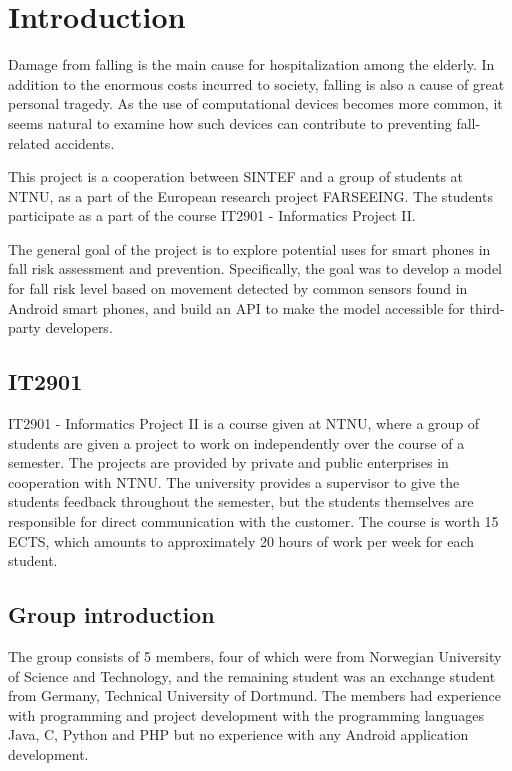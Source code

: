 \chapter{Introduction}

Damage from falling is the main cause for hospitalization among the elderly. In addition to the enormous costs incurred to society, falling is also a cause of great personal tragedy. As the use of computational devices becomes more common, it seems natural to examine how such devices can contribute to preventing fall-related accidents.

This project is a cooperation between SINTEF and a group of students at NTNU, as a part of the European research project FARSEEING. The students participate as a part of the course IT2901 - Informatics Project II.

The general goal of the project is to explore potential uses for smart phones in fall risk assessment and prevention. Specifically, the goal was to develop a model for fall risk level based on movement detected by common sensors found in Android smart phones, and build an API to make the model accessible for third-party developers.



\section{IT2901}
IT2901 - Informatics Project II is a course given at NTNU, where a group of students are given a project to work on independently over the course of a semester. The projects are provided by private and public enterprises in cooperation with NTNU. The university provides a supervisor to give the students feedback throughout the semester, but the students themselves are responsible for direct communication with the customer. The course is worth 15 ECTS, which amounts to approximately 20 hours of work per week for each student. 

\section{Group introduction}
The group consists of 5 members, four of which were from Norwegian University of Science and Technology, and the remaining student was an exchange student from Germany, Technical University of Dortmund. The members had experience with programming and project development with the programming languages Java, C, Python and PHP but no experience with any Android application development. 

